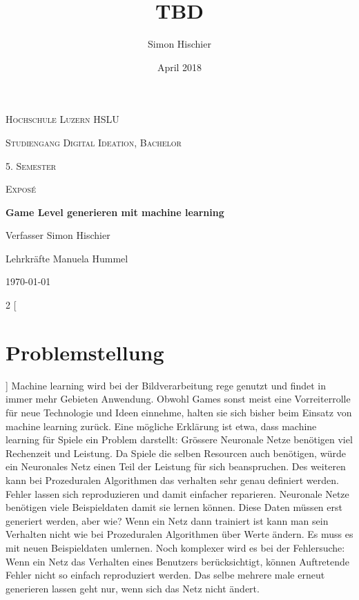 \documentclass[10pt,a4paper]{article}
\title{TBD}
\author{Simon Hischier}
\date{April 2018}
\begin{document}
\begin{titlepage}
\centering
\vspace{1cm}
	{\scshape\LARGE Hochschule Luzern HSLU \par}
	\vspace{1cm}
	{\scshape\Large Studiengang Digital Ideation, Bachelor \par}
	
	{\scshape\Large 5. Semester\par}
	{\scshape\Large Exposé \par}
	\vspace{1.5cm}
	{\huge\bf Game Level generieren mit machine learning\par}
	
	\vspace{10cm}
	{\Large Verfasser Simon Hischier\par}
	{\Large Lehrkräfte Manuela Hummel\par}
	\vfill

	{\large \today\par}
\end{titlepage}

\begin{multicols}{2}
[
\section{Problemstellung}
]
Machine learning wird bei der Bildverarbeitung rege genutzt und findet in immer mehr Gebieten Anwendung. Obwohl Games sonst meist eine Vorreiterrolle für neue Technologie und Ideen einnehme, halten sie sich bisher beim Einsatz von machine learning zurück. Eine mögliche Erklärung ist etwa, dass machine learning für Spiele ein Problem darstellt: Grössere Neuronale Netze benötigen viel Rechenzeit und Leistung. Da Spiele die selben Resourcen auch benötigen, würde ein Neuronales Netz einen Teil der Leistung für sich beanspruchen. Des weiteren kann bei Prozeduralen Algorithmen das verhalten sehr genau definiert werden. Fehler lassen sich reproduzieren und damit einfacher reparieren. Neuronale Netze benötigen viele Beispieldaten damit sie lernen können. Diese Daten müssen erst generiert werden, aber wie? Wenn ein Netz dann trainiert ist kann man sein Verhalten nicht wie bei Prozeduralen Algorithmen über Werte ändern. Es muss es mit neuen Beispieldaten umlernen. Noch komplexer wird es bei der Fehlersuche: Wenn ein Netz das Verhalten eines Benutzers berücksichtigt, können Auftretende Fehler nicht so einfach reproduziert werden. Das selbe mehrere male erneut generieren lassen geht nur, wenn sich das Netz nicht ändert.
\end{multicols}
\end{document}
